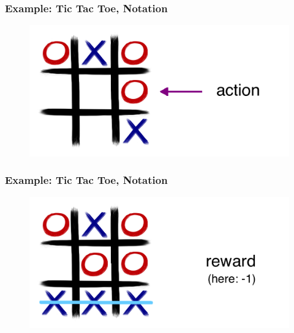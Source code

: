 \documentclass[handout]{beamer}
\begin{document}
\begin{frame}\frametitle{Example: Tic Tac Toe, Notation}\small
\vspace{4mm}

\begin{figure}
\includegraphics[width=0.75\linewidth]{Figures/tic1b}
\end{figure}
\vspace{5mm}
\end{frame}

\begin{frame}\frametitle{Example: Tic Tac Toe, Notation}\small
\vspace{4mm}

\begin{figure}
\includegraphics[width=0.75\linewidth]{Figures/tic1e}
\end{figure}
\vspace{5mm}
\end{frame}
\end{document}
